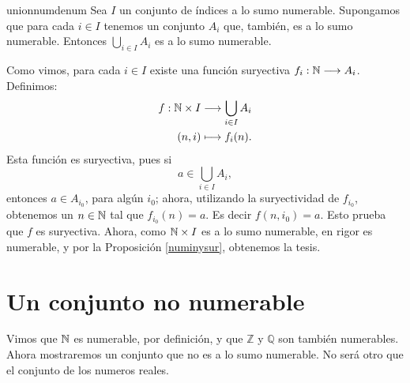 \begin{proposicion}{unionnumdenum} Sea $I$ un conjunto de índices a lo sumo
numerable. Supongamos que para cada $i\in I$ tenemos un conjunto
$A_i$ que, también, es a lo sumo numerable. Entonces $\bigcup_{i\in I}A_i$
es a lo sumo numerable. 
\end{proposicion}

\begin{demo} Como vimos, para cada $i\in I$ existe una función
suryectiva $f_i:\mathbb{N}\longrightarrow A_i$. Definimos:
\[\begin{split}
      f:\mathbb{N}\times I &\longrightarrow \bigcup_{i\in I}A_i\\
         (n,i)&\longmapsto f_i(n).\\
 \end{split}
\]
Esta función es suryectiva, pues si
\[a\in\bigcup_{i\in I}A_i,\]
entonces $a\in A_{i_0}$, para algún $i_0$; ahora, utilizando la
suryectividad de $f_{i_0}$, obtenemos un $n\in\mathbb{N}$ tal que
$f_{i_0}(n)=a$. Es decir $f(n,i_0)=a$. Esto prueba que $f$  es
suryectiva. Ahora, como $\mathbb{N}\times I$ es a lo sumo numerable, en
rigor es numerable, y por la Proposición \vref{numinysur},
obtenemos la tesis.
\end{demo}


\section{Un conjunto no numerable} 
Vimos que $\mathbb{N}$ es numerable, por definición, y que $\mathbb{Z}$
y $\mathbb{Q}$ son también numerables. Ahora mostraremos un
conjunto que no es a lo sumo numerable. No será otro que el
conjunto de los numeros reales.


